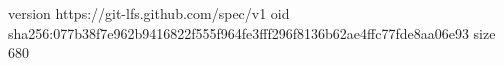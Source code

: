version https://git-lfs.github.com/spec/v1
oid sha256:077b38f7e962b9416822f555f964fe3fff296f8136b62ae4ffc77fde8aa06e93
size 680
